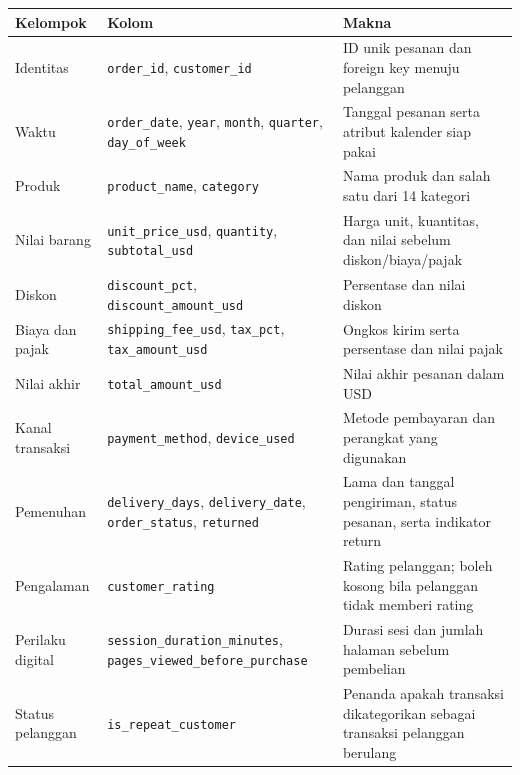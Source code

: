 \documentclass[
  indonesian,
  letterpaper,
  DIV=11,
  numbers=noendperiod]{scrreprt}
\newcounter{none} %
\begin{document}
{\def\LTcaptype{none} %
\begin{longtable}[]{@{}
  >{\raggedright\arraybackslash}p{}
  >{\raggedright\arraybackslash}p{}
  >{\raggedright\arraybackslash}p{}@{}}
\toprule\noalign{}
\begin{minipage}[b]{\linewidth}\raggedright
Kelompok
\end{minipage} & \begin{minipage}[b]{\linewidth}\raggedright
Kolom
\end{minipage} & \begin{minipage}[b]{\linewidth}\raggedright
Makna
\end{minipage} \\
\midrule\noalign{}
\endhead
\bottomrule\noalign{}
\endlastfoot
Identitas & \texttt{order\_id}, \texttt{customer\_id} & ID unik pesanan
dan foreign key menuju pelanggan \\
Waktu & \texttt{order\_date}, \texttt{year}, \texttt{month},
\texttt{quarter}, \texttt{day\_of\_week} & Tanggal pesanan serta atribut
kalender siap pakai \\
Produk & \texttt{product\_name}, \texttt{category} & Nama produk dan
salah satu dari 14 kategori \\
Nilai barang & \texttt{unit\_price\_usd}, \texttt{quantity},
\texttt{subtotal\_usd} & Harga unit, kuantitas, dan nilai sebelum
diskon/biaya/pajak \\
Diskon & \texttt{discount\_pct}, \texttt{discount\_amount\_usd} &
Persentase dan nilai diskon \\
Biaya dan pajak & \texttt{shipping\_fee\_usd}, \texttt{tax\_pct},
\texttt{tax\_amount\_usd} & Ongkos kirim serta persentase dan nilai
pajak \\
Nilai akhir & \texttt{total\_amount\_usd} & Nilai akhir pesanan dalam
USD \\
Kanal transaksi & \texttt{payment\_method}, \texttt{device\_used} &
Metode pembayaran dan perangkat yang digunakan \\
Pemenuhan & \texttt{delivery\_days}, \texttt{delivery\_date},
\texttt{order\_status}, \texttt{returned} & Lama dan tanggal pengiriman,
status pesanan, serta indikator return \\
Pengalaman & \texttt{customer\_rating} & Rating pelanggan; boleh kosong
bila pelanggan tidak memberi rating \\
Perilaku digital & \texttt{session\_duration\_minutes},
\texttt{pages\_viewed\_before\_purchase} & Durasi sesi dan jumlah
halaman sebelum pembelian \\
Status pelanggan & \texttt{is\_repeat\_customer} & Penanda apakah
transaksi dikategorikan sebagai transaksi pelanggan berulang \\
\end{longtable}
}
\end{document}
